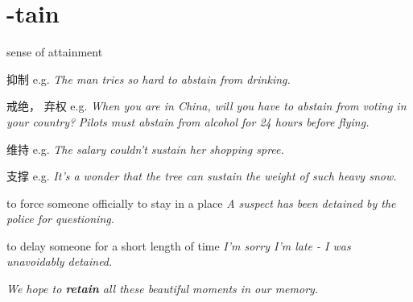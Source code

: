 \chapter{-tain}

\begin{vocabulary}[maintain]
\end{vocabulary}

\begin{vocabulary}[obtain]
\end{vocabulary}

\begin{vocabulary}
    sense of attainment
\end{vocabulary}

\begin{vocabulary}[abstain]
    抑制
    e.g. \textit{The man tries so hard to abstain from drinking.}
    
    戒绝， 弃权
    e.g. \textit{When you are in China, will you have to abstain from voting in your country?}
    \textit{Pilots must abstain from alcohol for 24 hours before flying.}
\end{vocabulary}

\begin{vocabulary}
维持
e.g. \textit{The salary couldn't sustain her shopping spree.}

支撑
e.g. \textit{It's a wonder that the tree can sustain the weight of such heavy snow.}

\end{vocabulary}

\begin{vocabulary}
to force someone officially to stay in a place
\textit{A suspect has been detained by the police for questioning.}
 
to delay someone for a short length of time
\textit{I'm sorry I'm late - I was unavoidably detained.}
\end{vocabulary}

\begin{vocabulary}[retain]
    \textit{We hope to \textbf{retain} all these beautiful moments in our memory.}
\end{vocabulary}





